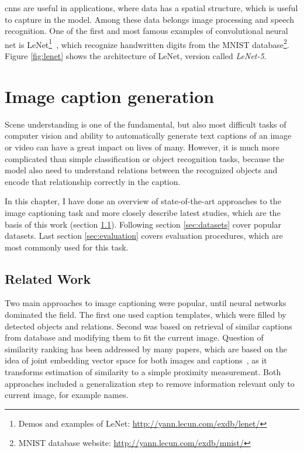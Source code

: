 \gls{cnn}s are useful in applications, where data has a spatial structure, which is useful to capture in the model. Among these data belongs image processing and speech recognition. One of the first and most famous examples of convolutional neural net is LeNet\footnote{Demos and examples of LeNet: \url{http://yann.lecun.com/exdb/lenet/}}~\cite{lecun-98}, which recognize handwritten digits from the MNIST database\footnote{MNIST database website: \url{http://yann.lecun.com/exdb/mnist/}}. Figure \ref{fig:lenet} shows the architecture of LeNet, version called \emph{LeNet-5}.

\chapter{Image caption generation}\label{chp:captions}

Scene understanding is one of the fundamental, but also most difficult tasks of computer vision and ability to automatically generate text captions of an image or video can have a great impact on lives of many. However, it is much more complicated than simple classification or object recognition tasks, because the model also need to understand relations between the recognized objects and encode that relationship correctly in the caption.

In this chapter, I have done an overview of state-of-the-art approaches to the image captioning task and more closely describe latest studies, which are the basis of this work (section \ref{sec:related}). Following section \ref{sec:datasets} cover popular datasets. Last section \ref{sec:evaluation} covers evaluation procedures, which are most commonly used for this task.

\section{Related Work}\label{sec:related}

Two main approaches to image captioning were popular, until neural networks dominated the field. The first one used caption templates, which were filled by detected objects and relations. Second was based on retrieval of similar captions from database and modifying them to fit the current image. Question of similarity ranking has been addressed by many papers, which are based on the idea of joint embedding vector space for both images and captions~\cite{DBLP:journals/corr/KarpathyF14}, as it transforms estimation of similarity to a simple proximity measurement. Both approaches included a generalization step to remove information relevant only to current image, for example names.

